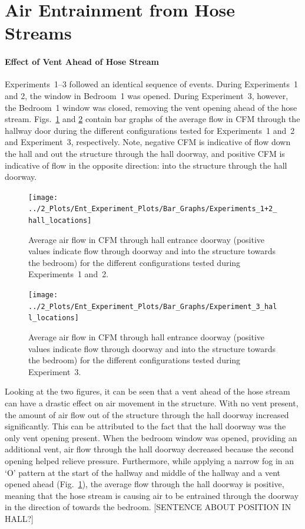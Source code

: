 \documentclass[12pt,oneside]{book}
\begin{document}
\section{Air Entrainment from Hose Streams}

\paragraph{Effect of Vent Ahead of Hose Stream} \mbox{}

Experiments~1--3 followed an identical sequence of events. During Experiments~1 and 2, the window in Bedroom~1 was opened. During Experiment~3, however, the Bedroom~1 window was closed, removing the vent opening ahead of the hose stream. Figs.~\ref{fig:Exps1_and_2_bar_graph} and \ref{fig:Exp3_bar_graph} contain bar graphs of the average flow in CFM through the hallway door during the different configurations tested for Experiments~1 and~2 and Experiment~3, respectively. Note, negative CFM is indicative of flow down the hall and out the structure through the hall doorway, and positive CFM is indicative of flow in the opposite direction: into the structure through the hall doorway.

\begin{figure}[!ht]
	\centering
	\texttt{[image: ../2\_Plots/Ent\_Experiment\_Plots/Bar\_Graphs/Experiments\_1+2\_hall\_locations]}
	\caption{Average air flow in CFM through hall entrance doorway (positive values indicate flow through doorway and into the structure towards the bedroom) for the different configurations tested during Experiments~1 and~2.}
	\label{fig:Exps1_and_2_bar_graph}
\end{figure}

\begin{figure}[!ht]
	\centering
	\texttt{[image: ../2\_Plots/Ent\_Experiment\_Plots/Bar\_Graphs/Experiment\_3\_hall\_locations]}
	\caption{Average air flow in CFM through hall entrance doorway (positive values indicate flow through doorway and into the structure towards the bedroom) for the different configurations tested during Experiment~3.}
	\label{fig:Exp3_bar_graph}
\end{figure}

Looking at the two figures, it can be seen that a vent ahead of the hose stream can have a drastic effect on air movement in the structure. With no vent present, the amount of air flow out of the structure through the hall doorway increased significantly. This can be attributed to the fact that the hall doorway was the only vent opening present. When the bedroom window was opened, providing an additional vent, air flow through the hall doorway decreased because the second opening helped relieve pressure. Furthermore, while applying a narrow fog in an `O' pattern at the start of the hallway and middle of the hallway and a vent opened ahead (Fig.~\ref{fig:Exps1_and_2_bar_graph}), the average flow through the hall doorway is positive, meaning that the hose stream is causing air to be entrained through the doorway in the direction of towards the bedroom. [SENTENCE ABOUT POSITION IN HALL?]
\end{document}

